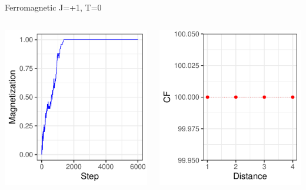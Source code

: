 \documentclass{beamer}
\begin{document}
\begin{frame}{Ferromagnetic J=+1, T=0}
\begin{columns}
\begin{column}{0.5\textwidth}
    \begin{center}
     \includegraphics[width=\textwidth]{Pic/J+1_10_6000_T=0_Magnetization.pdf}
     \end{center}
\end{column}
\begin{column}{0.5\textwidth}
    \begin{center}
     \includegraphics[width=\textwidth]{Pic/J+1_10_6000_T=0_Coherence.pdf}

\end{center}
\end{column}
\end{columns}
\end{frame}
\end{document}
